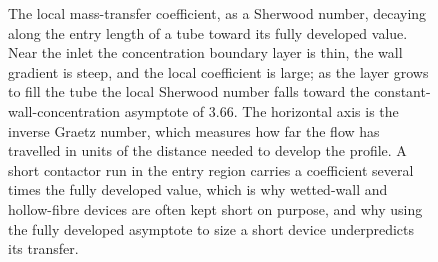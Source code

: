 \begin{figure}[htbp]
\centering
{}
\caption[The local Sherwood number down the entry length of a
tube]{The local mass-transfer coefficient, as a Sherwood number, decaying
along the entry length of a tube toward its fully developed value. Near the
inlet the concentration boundary layer is thin, the wall gradient is steep,
and the local coefficient is large; as the layer grows to fill the tube the
local Sherwood number falls toward the constant-wall-concentration asymptote
of $3.66$. The horizontal axis is the inverse Graetz number, which measures
how far the flow has travelled in units of the distance needed to develop the
profile. A short contactor run in the entry region carries a coefficient
several times the fully developed value, which is why wetted-wall and
hollow-fibre devices are often kept short on purpose, and why using the
fully developed asymptote to size a short device underpredicts its transfer.}
\label{fig:vol04ch07:entry-length}
\end{figure}
